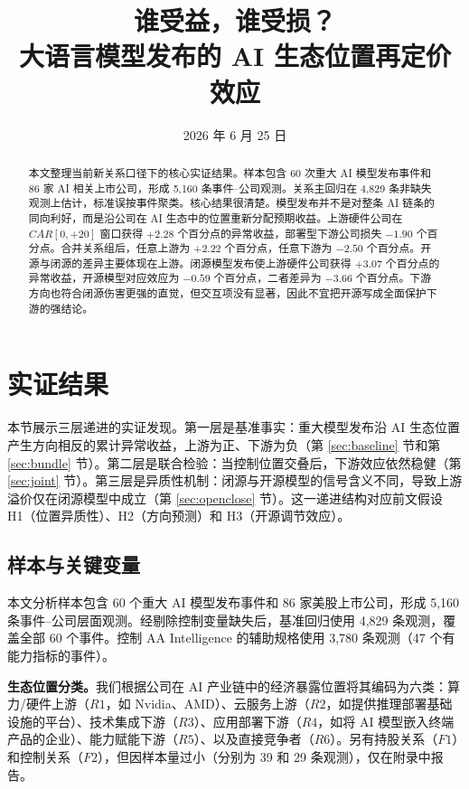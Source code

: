 \documentclass[11pt,fontset=fandol,a4paper]{ctexart}
\title{\textbf{谁受益，谁受损？\\大语言模型发布的 AI 生态位置再定价效应}}
\author{}
\date{2026 年 6 月 25 日}
\begin{document}
\maketitle

\begin{abstract}
本文整理当前新关系口径下的核心实证结果。样本包含 60 次重大 AI 模型发布事件和 86 家 AI 相关上市公司，形成 5{,}160 条事件--公司观测。关系主回归在 4{,}829 条非缺失观测上估计，标准误按事件聚类。核心结果很清楚。模型发布并不是对整条 AI 链条的同向利好，而是沿公司在 AI 生态中的位置重新分配预期收益。上游硬件公司在 $CAR[0,+20]$ 窗口获得 $+2.28$ 个百分点的异常收益，部署型下游公司损失 $-1.90$ 个百分点。合并关系组后，任意上游为 $+2.22$ 个百分点，任意下游为 $-2.50$ 个百分点。开源与闭源的差异主要体现在上游。闭源模型发布使上游硬件公司获得 $+3.07$ 个百分点的异常收益，开源模型对应效应为 $-0.59$ 个百分点，二者差异为 $-3.66$ 个百分点。下游方向也符合闭源伤害更强的直觉，但交互项没有显著，因此不宜把开源写成全面保护下游的强结论。
\end{abstract}

\section{实证结果}

本节展示三层递进的实证发现。第一层是基准事实：重大模型发布沿 AI 生态位置产生方向相反的累计异常收益，上游为正、下游为负（第 \ref{sec:baseline} 节和第 \ref{sec:bundle} 节）。第二层是联合检验：当控制位置交叠后，下游效应依然稳健（第 \ref{sec:joint} 节）。第三层是异质性机制：闭源与开源模型的信号含义不同，导致上游溢价仅在闭源模型中成立（第 \ref{sec:openclose} 节）。这一递进结构对应前文假设 H1（位置异质性）、H2（方向预测）和 H3（开源调节效应）。

\subsection{样本与关键变量}

本文分析样本包含 60 个重大 AI 模型发布事件和 86 家美股上市公司，形成 5{,}160 条事件--公司层面观测。经剔除控制变量缺失后，基准回归使用 4{,}829 条观测，覆盖全部 60 个事件。控制 AA Intelligence 的辅助规格使用 3{,}780 条观测（47 个有能力指标的事件）。

\textbf{生态位置分类。}我们根据公司在 AI 产业链中的经济暴露位置将其编码为六类：算力/硬件上游（$R1$，如 Nvidia、AMD）、云服务上游（$R2$，如提供推理部署基础设施的平台）、技术集成下游（$R3$）、应用部署下游（$R4$，如将 AI 模型嵌入终端产品的企业）、能力赋能下游（$R5$）、以及直接竞争者（$R6$）。另有持股关系（$F1$）和控制关系（$F2$），但因样本量过小（分别为 39 和 29 条观测），仅在附录中报告。
\end{document}
